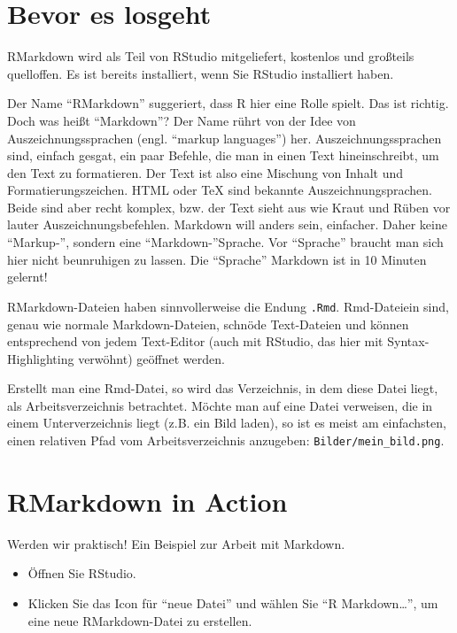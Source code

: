 \documentclass[12pt,]{book}
\begin{document}
\section{Bevor es losgeht}\label{bevor-es-losgeht}

RMarkdown wird als Teil von RStudio mitgeliefert, kostenlos und
großteils quelloffen. Es ist bereits installiert, wenn Sie RStudio
installiert haben.

Der Name ``RMarkdown'' suggeriert, dass R hier eine Rolle spielt. Das
ist richtig. Doch was heißt ``Markdown''? Der Name rührt von der Idee
von Auszeichnungssprachen (engl. ``markup languages'') her.
Auszeichnungssprachen sind, einfach gesgat, ein paar Befehle, die man in
einen Text hineinschreibt, um den Text zu formatieren. Der Text ist also
eine Mischung von Inhalt und Formatierungszeichen. HTML oder TeX sind
bekannte Auszeichnungsprachen. Beide sind aber recht komplex, bzw. der
Text sieht aus wie Kraut und Rüben vor lauter Auszeichnungsbefehlen.
Markdown will anders sein, einfacher. Daher keine ``Markup-'', sondern
eine ``Markdown-''Sprache. Vor ``Sprache'' braucht man sich hier nicht
beunruhigen zu lassen. Die ``Sprache'' Markdown ist in 10 Minuten
gelernt!

RMarkdown-Dateien haben sinnvollerweise die Endung \texttt{.Rmd}.
Rmd-Dateiein sind, genau wie normale Markdown-Dateien, schnöde
Text-Dateien und können entsprechend von jedem Text-Editor (auch mit
RStudio, das hier mit Syntax-Highlighting verwöhnt) geöffnet werden.

Erstellt man eine Rmd-Datei, so wird das Verzeichnis, in dem diese Datei
liegt, als Arbeitsverzeichnis betrachtet. Möchte man auf eine Datei
verweisen, die in einem Unterverzeichnis liegt (z.B. ein Bild laden), so
ist es meist am einfachsten, einen relativen Pfad vom Arbeitsverzeichnis
anzugeben: \texttt{Bilder/mein\_bild.png}.

\section{RMarkdown in Action}\label{rmarkdown-in-action}

Werden wir praktisch! Ein Beispiel zur Arbeit mit Markdown.

\begin{itemize}
\item
  Öffnen Sie RStudio.
\item
  Klicken Sie das Icon für ``neue Datei'' und wählen Sie ``R
  Markdown\ldots{}'', um eine neue RMarkdown-Datei zu erstellen.
\end{itemize}
\end{document}
